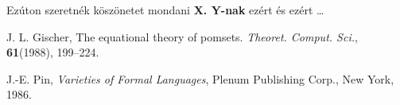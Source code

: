 \documentclass[12pt]{report}
\theoremstyle{definition}
\begin{document}
Ezúton szeretnék köszönetet mondani \textbf{X. Y-nak} ezért és ezért \ldots


%
%


\begin{thebibliography}{9}





	J. L. Gischer,
	The equational theory of pomsets.
	\emph{Theoret. Comput. Sci.}, \textbf{61}(1988), 199--224.

	J.-E. Pin,
	\emph{Varieties of Formal Languages},
	Plenum Publishing Corp., New York, 1986.





\end{thebibliography}
\end{document}
